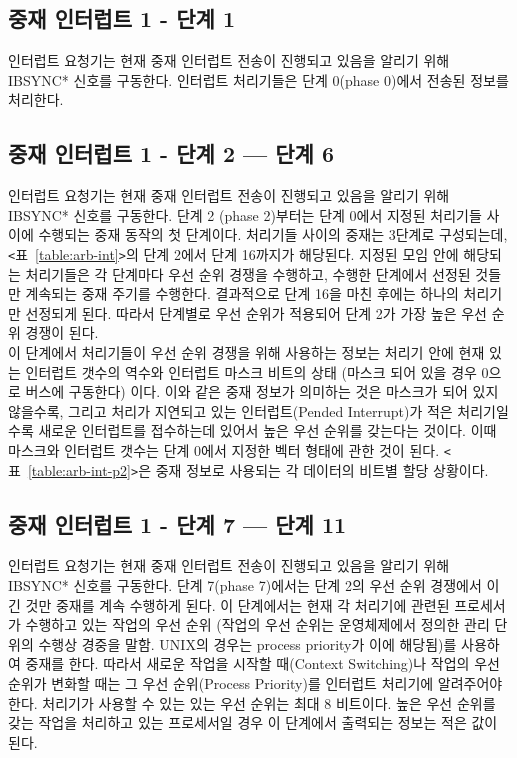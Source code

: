 \subsection*{중재 인터럽트 1 - 단계 1}
인터럽트 요청기는 현재 중재 인터럽트 전송이 진행되고 있음을 알리기 위해 IBSYNC* 신호를 구동한다.
인터럽트 처리기들은 단계 0(phase 0)에서 전송된 정보를 처리한다.
%
\subsection*{중재 인터럽트 1 - 단계 2 --- 단계 6}
인터럽트 요청기는 현재 중재 인터럽트 전송이 진행되고 있음을 알리기 위해 IBSYNC* 신호를 구동한다.
단계 2 (phase 2)부터는 단계 0에서 지정된 처리기들 사이에 수행되는 중재 동작의 첫 단계이다.
처리기들 사이의 중재는 3단계로 구성되는데, {\tt <}표~\ref{table:arb-int}{\tt >}의
단계 2에서 단계 16까지가 해당된다.
지정된 모임 안에 해당되는 처리기들은 각 단계마다 우선 순위 경쟁을 수행하고,
수행한 단계에서 선정된 것들만 계속되는 중재 주기를 수행한다.
결과적으로 단계 16을 마친 후에는 하나의 처리기만 선정되게 된다.
따라서 단계별로 우선 순위가 적용되어 단계 2가 가장 높은 우선 순위 경쟁이 된다. \\
이 단계에서 처리기들이 우선 순위 경쟁을 위해 사용하는 
정보는 처리기 안에 현재 있는 인터럽트 갯수의 역수와 인터럽트 마스크 비트의 
상태
(마스크 되어 있을 경우 0으로 버스에 구동한다) 이다.
이와 같은 중재 정보가 의미하는 것은 마스크가 되어 있지 않을수록, 그리고
처리가 지연되고 있는 인터럽트(Pended Interrupt)가 적은 처리기일수록 
새로운 인터럽트를 접수하는데 있어서 높은 우선 순위를 갖는다는 것이다.
이때 마스크와 인터럽트 갯수는 단계 0에서 지정한 벡터 형태에 관한 것이 된다.
{\tt <}표~\ref{table:arb-int-p2}{\tt >}은 중재 정보로
사용되는 각 데이터의 비트별 할당 상황이다.

%
\subsection*{중재 인터럽트 1 - 단계 7 --- 단계 11}
인터럽트 요청기는 현재 중재 인터럽트 전송이 진행되고 있음을 알리기 위해 IBSYNC* 신호를 구동한다.
단계 7(phase 7)에서는 단계 2의 우선 순위 경쟁에서 이긴 것만 중재를 계속 수행하게 된다.
이 단계에서는 현재 각 처리기에 관련된 프로세서가 수행하고 있는 작업의 우선 순위
(작업의 우선 순위는 운영체제에서 정의한 관리 단위의 수행상 경중을 말함.
UNIX의 경우는 process priority가 이에 해당됨)를 사용하여 중재를 한다.
따라서 새로운 작업을 시작할 때(Context Switching)나 작업의 우선 순위가 변화할 때는
그 우선 순위(Process Priority)를 인터럽트 처리기에 알려주어야 한다.
처리기가 사용할 수 있는 있는 우선 순위는 최대 8 비트이다.
높은 우선 순위를 갖는 작업을 처리하고 있는 프로세서일 경우 이 단계에서 출력되는 정보는
적은 값이 된다.

%
